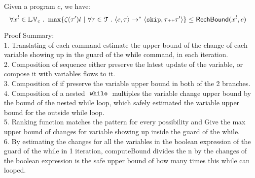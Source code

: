{
  \begin{thm}
    \label{thm:reachability_soundness}
  Given a program ${c}$, we have:
  \[
  \forall x^l \in \lvar_c \st 
  \max \left\{ \vcounter(\vtrace') l ~ \middle\vert~
  \forall \vtrace \in \mathcal{T} \st \config{{c}, \trace} \to^{*} \config{\eskip, \trace\tracecat\vtrace'} \right\} 
  \leq 
  \rb(x^l, c)
  \]
  \end{thm}
}
Proof Summary:
\\
1. Translating of each command estimate the upper bound of the change of each variable showing up in the guard of the while command, in each iteration.
\\
2. Composition of sequence either preserve the latest update of the variable, or compose it with variables flows to it.
\\
3. Composition of if preserve the variable upper bound in both of the 2 branches.
\\
4. Composition of a nested $\;\mathtt{while}\;$ multiples the variable change upper bound by the bound of the nested while loop, which safely estimated the variable upper bound for the outside while loop.
\\
5. Ranking function matches the pattern for every possibility and Give the max upper bound of changes for variable showing up inside the guard of the while.
\\
6. By estimating the changes for all the variables in the boolean expression of the guard of the while in 1 iteration, computeBound divides the n by the changes of the boolean expression is the safe upper bound of how many times this while can looped. 